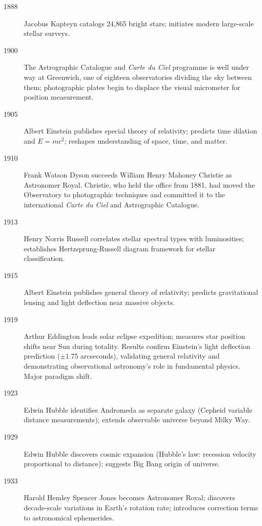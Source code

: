 \begin{description}
\item[1888] Jacobus Kapteyn catalogs 24,865 bright stars; initiates modern large-scale stellar surveys.

\item[1900] The Astrographic Catalogue and \emph{Carte du Ciel} programme is well under way at Greenwich, one of eighteen observatories dividing the sky between them; photographic plates begin to displace the visual micrometer for position measurement.

\item[1905] Albert Einstein publishes special theory of relativity; predicts time dilation and $E = mc^2$; reshapes understanding of space, time, and matter.

\item[1910] Frank Watson Dyson succeeds William Henry Mahoney Christie as Astronomer Royal. Christie, who held the office from 1881, had moved the Observatory to photographic techniques and committed it to the international \emph{Carte du Ciel} and Astrographic Catalogue.

\item[1913] Henry Norris Russell correlates stellar spectral types with luminosities; establishes Hertzsprung-Russell diagram framework for stellar classification.

\item[1915] Albert Einstein publishes general theory of relativity; predicts gravitational lensing and light deflection near massive objects.

\item[1919] Arthur Eddington leads solar eclipse expedition; measures star position shifts near Sun during totality. Results confirm Einstein's light deflection prediction ($\pm 1.75$ arcseconds), validating general relativity and demonstrating observational astronomy's role in fundamental physics. Major paradigm shift.

\item[1923] Edwin Hubble identifies Andromeda as separate galaxy (Cepheid variable distance measurements); extends observable universe beyond Milky Way.

\item[1929] Edwin Hubble discovers cosmic expansion (Hubble's law: recession velocity proportional to distance); suggests Big Bang origin of universe.

\item[1933] Harold Hemley Spencer Jones becomes Astronomer Royal; discovers decade-scale variations in Earth's rotation rate; introduces correction terms to astronomical ephemerides.


\end{description}
